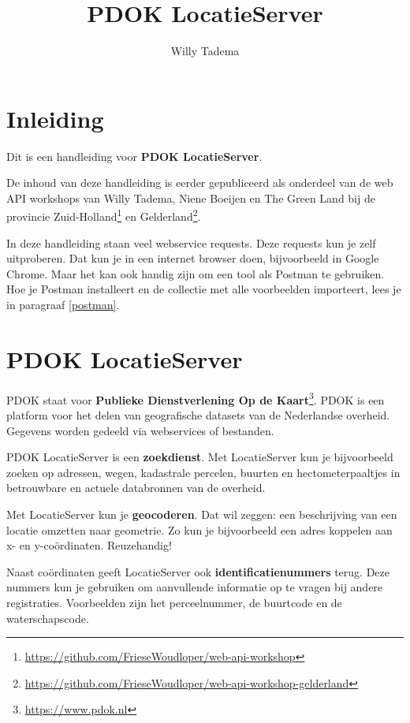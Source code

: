 \documentclass[]{book}
\title{PDOK LocatieServer}
\author{Willy Tadema}
\date{}
\let\rmarkdownfootnote\footnote%
\def\footnote{\protect\rmarkdownfootnote}
\begin{document}
\maketitle

{
\setcounter{tocdepth}{1}
\tableofcontents
}
\hypertarget{inleiding}{%
\chapter*{Inleiding}\label{inleiding}}

Dit is een handleiding voor \textbf{PDOK LocatieServer}.

De inhoud van deze handleiding is eerder gepubliceerd als onderdeel van de web API workshops van Willy Tadema, Niene Boeijen en The Green Land bij de provincie Zuid-Holland\footnote{\url{https://github.com/FrieseWoudloper/web-api-workshop}} en Gelderland\footnote{\url{https://github.com/FrieseWoudloper/web-api-workshop-gelderland}}.

In deze handleiding staan veel webservice requests. Deze requests kun je zelf uitproberen. Dat kun je in een internet browser doen, bijvoorbeeld in Google Chrome. Maar het kan ook handig zijn om een tool als Postman te gebruiken. Hoe je Postman installeert en de collectie met alle voorbeelden importeert, lees je in paragraaf \ref{postman}.

\hypertarget{intro}{%
\chapter{PDOK LocatieServer}\label{intro}}

PDOK staat voor \textbf{Publieke Dienstverlening Op de Kaart}\footnote{\url{https://www.pdok.nl}}. PDOK is een platform voor het delen van geografische datasets van de Nederlandse overheid. Gegevens worden gedeeld via webservices of bestanden.

PDOK LocatieServer is een \textbf{zoekdienst}. Met LocatieServer kun je bijvoorbeeld zoeken op adressen, wegen, kadastrale percelen, buurten en hectometerpaaltjes in betrouwbare en actuele databronnen van de overheid.

Met LocatieServer kun je \textbf{geocoderen}. Dat wil zeggen: een beschrijving van een locatie omzetten naar geometrie. Zo kun je bijvoorbeeld een adres koppelen aan x- en y-coördinaten. Reuzehandig!

Naast coördinaten geeft LocatieServer ook \textbf{identificatienummers} terug. Deze nummers kun je gebruiken om aanvullende informatie op te vragen bij andere registraties. Voorbeelden zijn het perceelnummer, de buurtcode en de waterschapscode.
\end{document}
